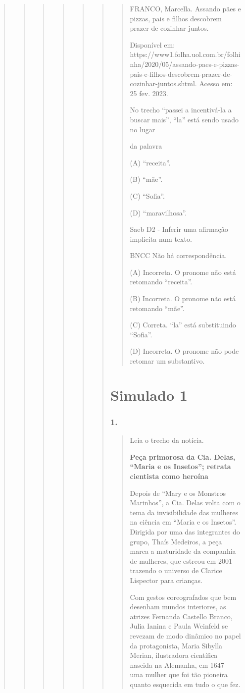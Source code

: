 \begin{quote}
\begin{quote}
\begin{quote}
\begin{quote}
\begin{quote}
\begin{quote}
\begin{quote}
FRANCO, Marcella. Assando pães e pizzas, pais e filhos descobrem prazer
de cozinhar juntos.

Disponível em:
https://www1.folha.uol.com.br/folhinha/2020/05/assando-paes-e-pizzas-pais-e-filhos-descobrem-prazer-de-cozinhar-juntos.shtml.
Acesso em: 25 fev. 2023.

No trecho ``passei a incentivá-la a buscar mais'', ``la'' está sendo
usado no lugar

da palavra

(A) ``receita''.

(B) ``mãe''.

(C) ``Sofia''.

(D) ``maravilhosa''.

Saeb D2 - Inferir uma afirmação implícita num texto.

BNCC Não há correspondência.

(A) Incorreta. O pronome não está retomando ``receita''.

(B) Incorreta. O pronome não está retomando ``mãe''.

(C) Correta. ``la'' está substituindo ``Sofia''.

(D) Incorreta. O pronome não pode retomar um substantivo.
\end{quote}

\section{Simulado 1}\label{simulado-1}

\subsubsection{1. }\label{section-80}

\begin{quote}
Leia o trecho da notícia.

\textbf{Peça primorosa da Cia. Delas, ``Maria e os Insetos''; retrata
cientista como heroína}

Depois de ``Mary e os Monstros Marinhos'', a Cia. Delas volta com o tema
da invisibilidade das mulheres na ciência em ``Maria e os Insetos''.
Dirigida por uma das integrantes do grupo, Thaís Medeiros, a peça marca
a maturidade da companhia de mulheres, que estreou em 2001 trazendo o
universo de Clarice Lispector para crianças.

Com gestos coreografados que bem desenham mundos interiores​, as atrizes
Fernanda Castello Branco, Julia Ianina e Paula Weinfeld se revezam de
modo dinâmico no papel da protagonista, Maria Sibylla Merian,
ilustradora científica nascida na Alemanha, em 1647 --- uma mulher que
foi tão pioneira quanto esquecida em tudo o que fez.


\end{quote}
\end{quote}
\end{quote}
\end{quote}
\end{quote}
\end{quote}
\end{quote}

